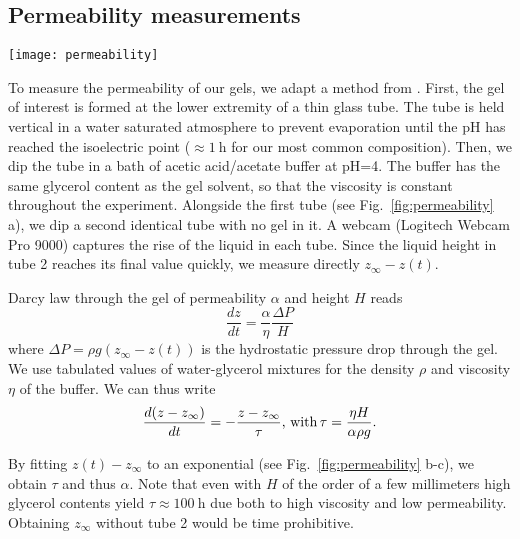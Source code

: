 \documentclass[twocolumn,superscriptaddress,showpacs,preprintnumbers,
amsmath,amssymb,prl]{revtex4-1}
\begin{document}
\subsection*{Permeability measurements}
\begin{figure*}
	\texttt{[image: permeability]}
	\caption{Permeability measurements. (a) Schematic representation of the experiment. (b-c) Evolution of the height of the interface in tube 1 relative to the final height in tube 2. The black line is the best exponential fit $Ae^{-t/\tau}$. (b) Gel is 4\%w casein, 4\%w GDL in water, $H=\SI{2.3}{\milli\metre}$ and $\tau=\SI{57}{\minute}$. (c) Same as (b) for a 50\%w glycerol--water mixture, $H=\SI{4}{\milli\metre}$ and $\tau=\SI{100}{\hour}$.}
	\label{fig:permeability}
\end{figure*}

To measure the permeability of our gels, we adapt a method from \cite{VanDijk1986}. First, the gel of interest is formed at the lower extremity of a thin glass tube. The tube is held vertical in a water saturated atmosphere to prevent evaporation until the pH has reached the isoelectric point ($\approx\SI{1}{\hour}$ for our most common composition). Then, we dip the tube in a bath of acetic acid/acetate buffer at pH=4. The buffer has the same glycerol content as the gel solvent, so that the viscosity is constant throughout the experiment. Alongside the first tube (see Fig.~\ref{fig:permeability} a), we dip a second identical tube with no gel in it. A webcam (Logitech Webcam Pro 9000) captures the rise of the liquid in each tube. Since the liquid height in tube 2 reaches its final value quickly, we measure directly $z_\infty-z(t)$.

Darcy law through the gel of permeability $\alpha$ and height $H$ reads 
\begin{equation}
\frac{dz}{dt} = \frac{\alpha}{\eta}\frac{\Delta P}{H}
\end{equation}
where $\Delta P=\rho g(z_\infty-z(t))$ is the hydrostatic pressure drop through the gel. We use tabulated values of water-glycerol mixtures for the density $\rho$ and viscosity $\eta$ of the buffer. We can thus write
\begin{equation}
\frac{d(z-z_\infty)}{dt} = -\frac{z-z_\infty}{\tau}\text{, with\,} \tau = \frac{\eta H}{\alpha \rho g}.
\end{equation}

By fitting $z(t)-z_\infty$ to an exponential (see Fig.~\ref{fig:permeability} b-c), we obtain $\tau$ and thus $\alpha$. Note that even with $H$ of the order of a few millimeters high glycerol contents yield $\tau\approx \SI{100}{\hour}$ due both to high viscosity and low permeability. Obtaining $z_\infty$ without tube 2 would be time prohibitive.
\end{document}
